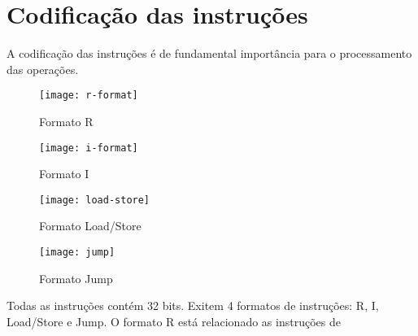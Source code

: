 \section{Codificação das instruções}
	A codificação das instruções é de fundamental importância para o processamento das operações.	 

	\begin{figure}[H]
    	\centering
    	\texttt{[image: r-format]}
    	\caption{Formato R}
		\label{r_format}
	\end{figure}
  	
	\begin{figure}[H]
    	\centering
    	\texttt{[image: i-format]}
    	\caption{Formato I}
		\label{i_format}
  	\end{figure}
  	
  	\begin{figure}[H]
    	\centering
    	\texttt{[image: load-store]}
    	\caption{Formato Load/Store}
		\label{loadstore}
  	\end{figure}
  	
   	\begin{figure}[H]
    	\centering
    	\texttt{[image: jump]}
    	\caption{Formato Jump}
		\label{jump}
  	\end{figure}
  	
 Todas as instruções contém 32 bits. Exitem 4 formatos de instruções: R, I, Load/Store e Jump. O formato R está relacionado as instruções de 
  	
 